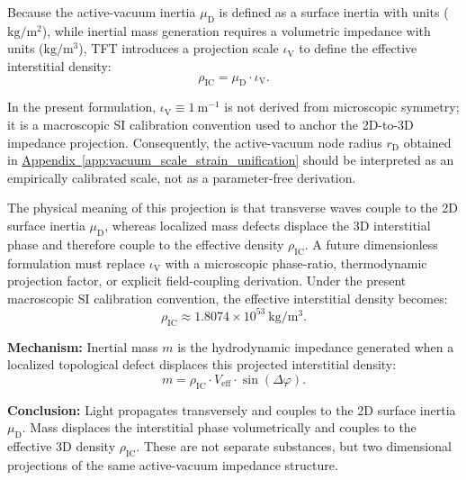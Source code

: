 Because the active-vacuum inertia $\mu_{\mathrm{D}}$ is defined as a surface inertia with units ($\mathrm{kg/m^2}$), while inertial mass generation requires a volumetric impedance with units ($\mathrm{kg/m^3}$), TFT introduces a projection scale $\iota_{\mathrm{V}}$ to define the effective interstitial density:
\begin{equation}
    \rho_{\mathrm{IC}} = \mu_{\mathrm{D}} \cdot \iota_{\mathrm{V}}.
\end{equation}

In the present formulation, $\iota_{\mathrm{V}} \equiv 1~\mathrm{m}^{-1}$ is not derived from microscopic symmetry; it is a macroscopic SI calibration convention used to anchor the 2D-to-3D impedance projection. Consequently, the active-vacuum node radius $r_{\mathrm{D}}$ obtained in \hyperref[app:vacuum_scale_strain_unification]{Appendix~\ref*{app:vacuum_scale_strain_unification}} should be interpreted as an empirically calibrated scale, not as a parameter-free derivation.

The physical meaning of this projection is that transverse waves couple to the 2D surface inertia $\mu_{\mathrm{D}}$, whereas localized mass defects displace the 3D interstitial phase and therefore couple to the effective density $\rho_{\mathrm{IC}}$. A future dimensionless formulation must replace $\iota_{\mathrm{V}}$ with a microscopic phase-ratio, thermodynamic projection factor, or explicit field-coupling derivation. Under the present macroscopic SI calibration convention, the effective interstitial density becomes:
\begin{equation}
    \rho_{\mathrm{IC}} \approx 1.8074 \times 10^{53}~\mathrm{kg/m^3}.
\end{equation}

\vspace{0.5em}
\noindent\textbf{Mechanism:} Inertial mass $m$ is the hydrodynamic impedance generated when a localized topological defect displaces this projected interstitial density:
\begin{equation}
    m = \rho_{\mathrm{IC}} \cdot V_{\mathrm{eff}} \cdot \sin(\Delta\varphi).
\end{equation}

\vspace{0.5em}
\noindent\textbf{Conclusion:} Light propagates transversely and couples to the 2D surface inertia $\mu_{\mathrm{D}}$. Mass displaces the interstitial phase volumetrically and couples to the effective 3D density $\rho_{\mathrm{IC}}$. These are not separate substances, but two dimensional projections of the same active-vacuum impedance structure.


